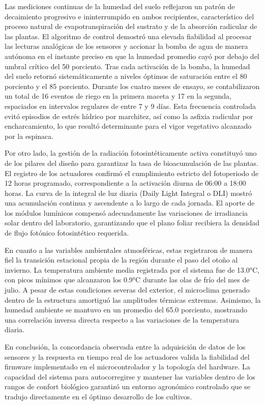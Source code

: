 Las mediciones continuas de la humedad del suelo reflejaron un patrón de decaimiento progresivo e ininterrumpido en ambos recipientes, característico del proceso natural de evapotranspiración del sustrato y de la absorción radicular de las plantas. El algoritmo de control demostró una elevada fiabilidad al procesar las lecturas analógicas de los sensores y accionar la bomba de agua de manera autónoma en el instante preciso en que la humedad promedio cayó por debajo del umbral crítico del 50 porciento. Tras cada activación de la bomba, la humedad del suelo retornó sistemáticamente a niveles óptimos de saturación entre el 80 porciento y el 85 porciento. Durante los cuatro meses de ensayo, se contabilizaron un total de 16 eventos de riego en la primera maceta y 17 en la segunda, espaciados en intervalos regulares de entre 7 y 9 días. Esta frecuencia controlada evitó episodios de estrés hídrico por marchitez, así como la asfixia radicular por encharcamiento, lo que resultó determinante para el vigor vegetativo alcanzado por la espinaca.

Por otro lado, la gestión de la radiación fotosintéticamente activa constituyó uno de los pilares del diseño para garantizar la tasa de bioacumulación de las plantas. El registro de los actuadores confirmó el cumplimiento estricto del fotoperiodo de 12 horas programado, correspondiente a la activación diurna de 06:00 a 18:00 horas. La curva de la integral de luz diaria (Daily Light Integral o DLI) mostró una acumulación continua y ascendente a lo largo de cada jornada. El aporte de los módulos lumínicos compensó adecuadamente las variaciones de irradiancia solar dentro del laboratorio, garantizando que el plano foliar recibiera la densidad de flujo fotónico fotosintético requerida.

En cuanto a las variables ambientales atmosféricas, estas registraron de manera fiel la transición estacional propia de la región durante el paso del otoño al invierno. La temperatura ambiente media registrada por el sistema fue de 13.0°C, con picos mínimos que alcanzaron los 0.9°C durante las olas de frío del mes de julio. A pesar de estas condiciones severas del exterior, el microclima generado dentro de la estructura amortiguó las amplitudes térmicas extremas. Asimismo, la humedad ambiente se mantuvo en un promedio del 65.0 porciento, mostrando una correlación inversa directa respecto a las variaciones de la temperatura diaria.

En conclusión, la concordancia observada entre la adquisición de datos de los sensores y la respuesta en tiempo real de los actuadores valida la fiabilidad del firmware implementado en el microcontrolador y la topología del hardware. La capacidad del sistema para autocorregirse y mantener las variables dentro de los rangos de confort biológico garantizó un entorno agronómico controlado que se tradujo directamente en el óptimo desarrollo de los cultivos.

